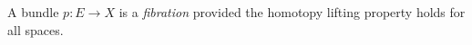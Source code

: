 A bundle $p \colon E \to X$ is a \textit{fibration} provided the homotopy lifting property holds for all spaces.
